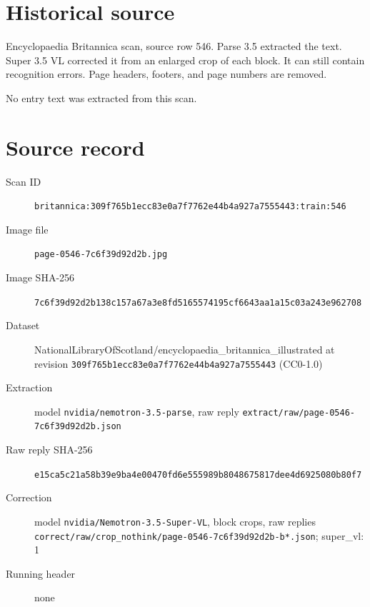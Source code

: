 \documentclass{article}
\begin{document}
\section*{Historical source}
Encyclopaedia Britannica scan, source row 546. Parse 3.5 extracted the text. Super 3.5 VL corrected it from an enlarged crop of each block. It can still contain recognition errors.
Page headers, footers, and page numbers are removed.

No entry text was extracted from this scan.

\section*{Source record}
\begin{description}
\item[Scan ID] \texttt{britannica:309f765b1ecc83e0a7f7762e44b4a927a7555443:train:546}
\item[Image file] \texttt{page-0546-7c6f39d92d2b.jpg}
\item[Image SHA-256] \texttt{7c6f39d92d2b138c157a67a3e8fd5165574195cf6643aa1a15c03a243e962708}
\item[Dataset] NationalLibraryOfScotland/encyclopaedia\_britannica\_illustrated at revision \texttt{309f765b1ecc83e0a7f7762e44b4a927a7555443} (CC0-1.0)
\item[Extraction] model \texttt{nvidia/nemotron-3.5-parse}, raw reply \texttt{extract/raw/page-0546-7c6f39d92d2b.json}
\item[Raw reply SHA-256] \texttt{e15ca5c21a58b39e9ba4e00470fd6e555989b8048675817dee4d6925080b80f7}
\item[Correction] model \texttt{nvidia/Nemotron-3.5-Super-VL}, block crops, raw replies \texttt{correct/raw/crop\_nothink/page-0546-7c6f39d92d2b-b*.json}; super\_vl: 1
\item[Running header] none
\end{description}
\end{document}
